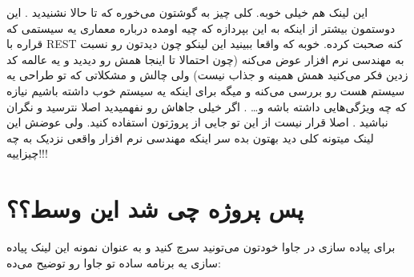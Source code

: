 \documentclass[]{article}
\begin{document}
\begin{center}
\href{https://www.moesif.com/blog/api-guide/api-design-guidelines/}{\textcolor{blue}{\underline{}}}
\end{center}

این لینک هم خیلی خوبه. کلی چیز به گوشتون می‌خوره که تا حالا نشنیدید . این دوستمون بیشتر از اینکه به این بپردازه که  چیه اومده درباره معماری یه سیستمی که قراره با REST  کنه صحبت کرده. خوبه که واقعا ببینید این لینکو چون دیدتون رو نسبت به مهندسی نرم افزار عوض می‌کنه (چون احتمالا تا اینجا همش  رو دیدید و یه عالمه کد زدین فکر می‌کنید همش همینه و جذاب نیست) ولی چالش و مشکلاتی که تو طراحی یه سیستم  هست رو بررسی می‌کنه و میگه برای اینکه یه سیستم خوب داشته باشیم نیازه که چه ویژگی‌هایی داشته باشه و… . اگر خیلی جاهاش رو نفهمیدید اصلا نترسید و نگران نباشید . اصلا قرار نیست از این تو جایی از پروژتون استفاده کنید. ولی عوضش این لینک میتونه کلی دید بهتون بده سر اینکه مهندسی نرم افزار واقعی نزدیک به چه چیزاییه!!!

\begin{center}
\href{https://blog.feathersjs.com/design-patterns-for-modern-web-apis-1f046635215}{\textcolor{blue}{\underline{}}}
\end{center}

\section*{{\titr پس پروژه چی شد این وسط؟؟
}}

برای پیاده سازی  در جاوا خودتون می‌تونید سرچ کنید و به عنوان نمونه این لینک پیاده سازی یه برنامه ساده  تو جاوا رو توضیح می‌ده:

\begin{center}
\href{https://happycoding.io/tutorials/java-server/rest-api#simple-example-rest-api}{\textcolor{blue}{\underline{}}}
\end{center}
\end{document}

